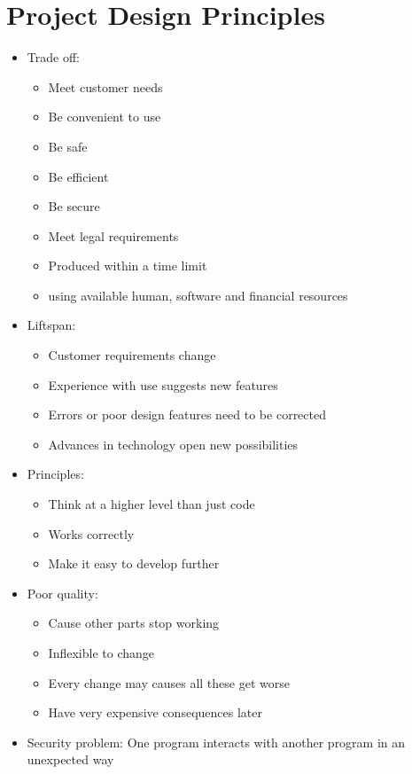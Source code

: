 \documentclass[12pt,openany]{book}
\begin{document}
\section{Project Design Principles}
\begin{itemize}
    \item Trade off:
    \begin{itemize}
        \item Meet customer needs
        \item Be convenient to use
        \item Be safe
        \item Be efficient
        \item Be secure
        \item Meet legal requirements
        \item Produced within a time limit
        \item using available human, software and financial resources 
    \end{itemize}
    \item Liftspan:
    \begin{itemize}
        \item Customer requirements change
        \item Experience with use suggests new features
        \item Errors or poor design features need to be corrected
        \item Advances in technology open new possibilities
    \end{itemize}
    \item Principles:
    \begin{itemize}
        \item Think at a higher level than just code
        \item Works correctly
        \item Make it easy to develop further
    \end{itemize}
    \item Poor quality:
    \begin{itemize}
        \item Cause other parts stop working
        \item Inflexible to change
        \item Every change may causes all these get worse
        \item Have very expensive consequences later
    \end{itemize}
    \item Security problem: One program interacts with another program in an unexpected way

\end{itemize}
\end{document}
